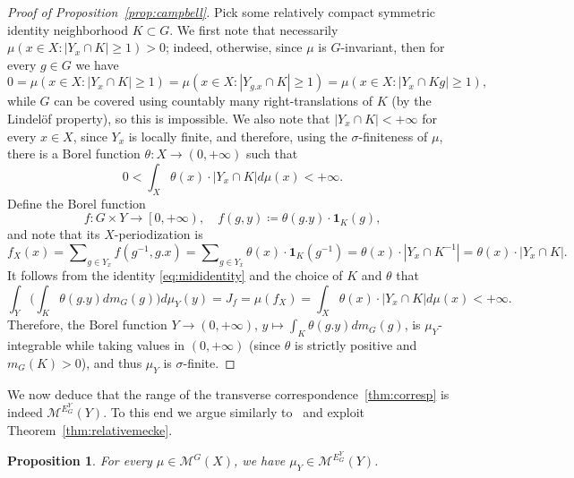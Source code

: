 \documentclass{amsart}
\numberwithin{equation}{subsection}
\newtheorem{prop}[thm]{Proposition}
\theoremstyle{remark}
\begin{document}
\begin{proof}[Proof of Proposition~\ref{prop:campbell}]
Pick some relatively compact symmetric identity neighborhood \(K\subset G\). We first note that necessarily \(\mu\left(x\in X:\left|Y_{x}\cap K\right|\geq1\right)>0\); indeed, otherwise, since \(\mu\) is \(G\)-invariant, then for every \(g\in G\) we have
\[0=\mu\left(x\in X:\left|Y_{x}\cap K\right|\geq1\right)=\mu\left(x\in X:\left|Y_{g.x}\cap K\right|\geq1\right)=\mu\left(x\in X:\left|Y_{x}\cap Kg\right|\geq1\right),\]
while \(G\) can be covered using countably many right-translations of \(K\) (by the Lindel\"{o}f property), so this is impossible. We also note that \(\left|Y_{x}\cap K\right|<+\infty\) for every \(x\in X\), since \(Y_{x}\) is locally finite, and therefore, using the \(\sigma\)-finiteness of \(\mu\), there is a Borel function \(\theta:X\to\left(0,+\infty\right)\) such that
\[0<\int_{X}\theta\left(x\right)\cdot\left|Y_{x}\cap K\right|d\mu\left(x\right)<+\infty.\]
Define the Borel function
\[f:G\times Y\to\left[0,+\infty\right),\quad f\left(g,y\right)\coloneqq\theta\left(g.y\right)\cdot\mathbf{1}_{K}\left(g\right),\]
and note that its \(X\)-periodization is
\[f_{X}\left(x\right)=\sum\nolimits_{g\in Y_{x}}f\left(g^{-1},g.x\right)=\sum\nolimits_{g\in Y_{x}}\theta\left(x\right)\cdot\mathbf{1}_{K}\left(g^{-1}\right)=\theta\left(x\right)\cdot\left|Y_{x}\cap K^{-1}\right|=\theta\left(x\right)\cdot\left|Y_{x}\cap K\right|.\]
It follows from the identity \eqref{eq:mididentity} and the choice of \(K\) and \(\theta\) that
\[\int_{Y}\Big(\int_{K}\theta\left(g.y\right)dm_{G}\left(g\right)\Big)d\mu_{Y}\left(y\right)=J_{f}=\mu\left(f_{X}\right)=\int_{X}\theta\left(x\right)\cdot\left|Y_{x}\cap K\right|d\mu\left(x\right)<+\infty.\]
Therefore, the Borel function \(Y\to\left(0,+\infty\right)\), \(y\mapsto\int_{K}\theta\left(g.y\right)dm_{G}\left(g\right)\), is \(\mu_{Y}\)-integrable while taking values in \(\left(0,+\infty\right)\) (since \(\theta\) is strictly positive and \(m_{G}\left(K\right)>0\)), and thus \(\mu_{Y}\) is \(\sigma\)-finite.
\end{proof}

We now deduce that the range of the transverse correspondence~\ref{thm:corresp} is indeed \(\mathcal{M}^{E_{G}^{Y}}\left(Y\right)\). To this end we argue similarly to~\cite[Theorem 3.15]{last2009} and exploit Theorem~\ref{thm:relativemecke}.

\begin{prop}\label{prop:mecke}
For every \(\mu\in\mathcal{M}^{G}\left(X\right)\), we have \(\mu_{Y}\in \mathcal{M}^{E_{G}^{Y}}\left(Y\right)\).
\end{prop}
\end{document}
